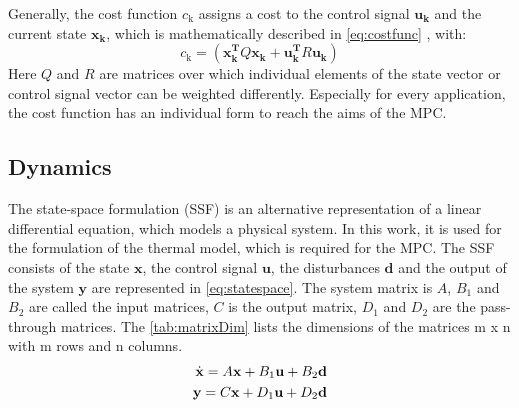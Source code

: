     Generally, the cost function $c_\text{k}$ assigns a cost to the control signal $\mathbf{u_k}$ and the current state $\mathbf{x_k}$, which is mathematically described in
    \autoref{eq:costfunc}
    , with:
    \begin{equation}
    \label{eq:c_k}
    c_\text{k} = (\mathbf{x_k^T}Q\mathbf{x_k}+\mathbf{u_k^T}R\mathbf{u_k})
    \end{equation}
    Here $Q$ and $R$ are matrices over which individual elements of the state vector or control signal vector can be weighted differently.  
    \cite{Kouvaritakis.2016}
    Especially for every application, the cost function has an individual form to reach the aims of the MPC.
    
\subsection{Dynamics}
\label{subsection:dynamics}
    
    The state-space formulation (SSF) is an alternative representation of a linear differential equation, which models a physical system. In this work, it is used for the formulation of the thermal model, which is required for the MPC. The SSF consists of the state $\textbf{x}$, the control signal $\textbf{u}$, the disturbances $\textbf{d}$ and the output of the system $\textbf{y}$ are represented in \autoref{eq:statespace}. The system matrix is $A$, $B_\text{1}$ and $B_\text{2}$ are called the input matrices, $C$ is the output matrix, $D_\text{1}$ and $D_\text{2}$ are the pass-through matrices. The \autoref{tab:matrixDim} lists the dimensions of the matrices m x n with m rows and n columns.   
    \begin{align}
    \label{eq:statespace}
    \dot{\textbf{x}}=A\textbf{x}+B_1\textbf{u}+B_2\textbf{d}\\
    \textbf{y}=C\textbf{x}+D_1\textbf{u}+D_2\textbf{d} \notag
    \end{align}
    
